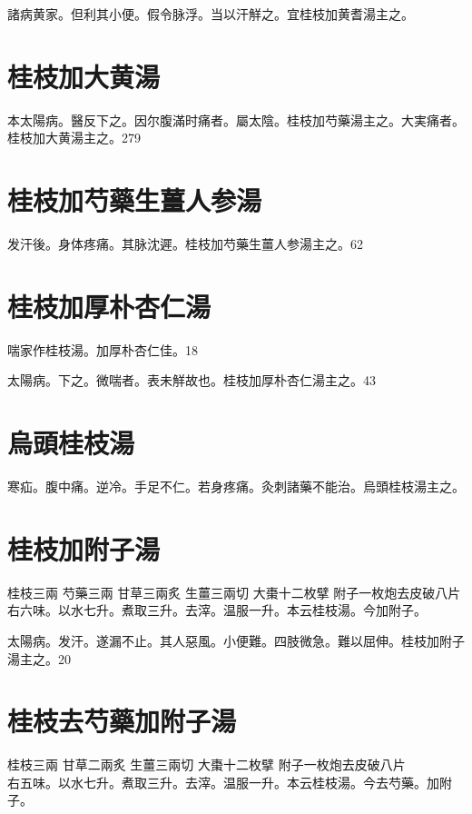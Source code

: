 \documentclass[12pt,twoside,UTF8,b5paper]{ctexbook}
\begin{document}
諸病黄家。但利其小便。假令脉浮。当以汗觧之。宜桂枝加黄耆湯主之。

\section{桂枝加大黄湯}

{本}太陽病。醫反下之。因尔腹滿时痛者。屬太陰。桂枝加芍藥湯主之。大実痛者。桂枝加大黄湯主之。279

\section{桂枝加芍藥生薑人参湯}

发汗後。身体疼痛。其脉沈遲。桂枝加芍藥生薑人参湯主之。62

\section{桂枝加厚朴杏仁湯}

喘家作桂枝湯。加厚朴杏仁佳。18

太陽病。下之。微喘者。表未觧故也。桂枝{加厚朴杏仁}湯主之。43

\section{烏頭桂枝湯}

寒疝。腹中痛。逆冷。手足不仁。若身疼痛。灸刺諸藥不能治。烏頭桂枝湯主之。

\section{桂枝加附子湯}

桂枝{\scriptsize 三兩} 芍藥{\scriptsize 三兩} 甘草{\scriptsize 三兩炙} 生薑{\scriptsize 三兩切} 大棗{\scriptsize 十二枚擘} 附子{\scriptsize 一枚炮去皮破八片}\\
右六味。以水七升。煮取三升。去滓。温服一升。本云桂枝湯。今加附子。

太陽病。发汗。遂漏不止。其人惡風。小便難。四肢微急。難以屈伸。桂枝加附子湯主之。20

\section{桂枝去芍藥加附子湯}

桂枝{\scriptsize 三兩} 甘草{\scriptsize 二兩炙} 生薑{\scriptsize 三兩切} 大棗{\scriptsize 十二枚擘} 附子{\scriptsize 一枚炮去皮破八片}\\
右五味。以水七升。煮取三升。去滓。温服一升。本云桂枝湯。今去芍藥。加附子。
\end{document}
